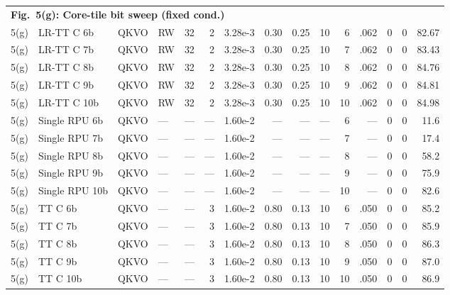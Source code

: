 \documentclass[AMA,LATO1COL]{WileyNJDv5}
\begin{document}
{\begin{longtable}{@{}l l l l r r r r r r r r r r r@{}}
\multicolumn{15}{l}{\cellcolor{HeadGray}\textbf{Fig.~5(g): Core-tile bit sweep (fixed cond.)}} \\
5(g) & LR-TT C 6b & QKVO & RW & 32 & 2 & 3.28e-3 & 0.30 & 0.25 & 10 & 6 & .062 & 0 & 0 & 82.67 \\
5(g) & LR-TT C 7b & QKVO & RW & 32 & 2 & 3.28e-3 & 0.30 & 0.25 & 10 & 7 & .062 & 0 & 0 & 83.43 \\
5(g) & LR-TT C 8b & QKVO & RW & 32 & 2 & 3.28e-3 & 0.30 & 0.25 & 10 & 8 & .062 & 0 & 0 & 84.76 \\
5(g) & LR-TT C 9b & QKVO & RW & 32 & 2 & 3.28e-3 & 0.30 & 0.25 & 10 & 9 & .062 & 0 & 0 & 84.81 \\
5(g) & LR-TT C 10b & QKVO & RW & 32 & 2 & 3.28e-3 & 0.30 & 0.25 & 10 & 10 & .062 & 0 & 0 & 84.98 \\
5(g) & Single RPU 6b & QKVO & --- & --- & --- & 1.60e-2 & --- & --- & --- & 6 & --- & 0 & 0 & 11.6 \\
5(g) & Single RPU 7b & QKVO & --- & --- & --- & 1.60e-2 & --- & --- & --- & 7 & --- & 0 & 0 & 17.4 \\
5(g) & Single RPU 8b & QKVO & --- & --- & --- & 1.60e-2 & --- & --- & --- & 8 & --- & 0 & 0 & 58.2 \\
5(g) & Single RPU 9b & QKVO & --- & --- & --- & 1.60e-2 & --- & --- & --- & 9 & --- & 0 & 0 & 75.9 \\
5(g) & Single RPU 10b & QKVO & --- & --- & --- & 1.60e-2 & --- & --- & --- & 10 & --- & 0 & 0 & 82.6 \\
5(g) & TT C 6b & QKVO & --- & --- & 3 & 1.60e-2 & 0.80 & 0.13 & 10 & 6 & .050 & 0 & 0 & 85.2 \\
5(g) & TT C 7b & QKVO & --- & --- & 3 & 1.60e-2 & 0.80 & 0.13 & 10 & 7 & .050 & 0 & 0 & 85.9 \\
5(g) & TT C 8b & QKVO & --- & --- & 3 & 1.60e-2 & 0.80 & 0.13 & 10 & 8 & .050 & 0 & 0 & 86.3 \\
5(g) & TT C 9b & QKVO & --- & --- & 3 & 1.60e-2 & 0.80 & 0.13 & 10 & 9 & .050 & 0 & 0 & 87.0 \\
5(g) & TT C 10b & QKVO & --- & --- & 3 & 1.60e-2 & 0.80 & 0.13 & 10 & 10 & .050 & 0 & 0 & 86.9 \\
\midrule


\end{longtable}}
\end{document}
